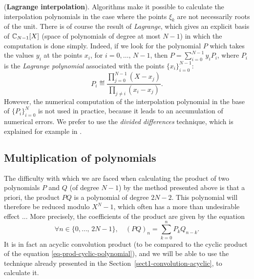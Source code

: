  
\begin{rem}{(\upshape \textbf{Lagrange interpolation}).} 
Algorithms make it possible to calculate the interpolation polynomials in the case where the points $ \xi_k $ are not necessarily roots of the unit. There is of course the result of \textit{Lagrange}, which gives an explicit basis of $ \mathbb{C}_{N-1}[X] $ (space of polynomials of degree at most $ N-1 $) in which the computation is done simply. Indeed, if we look for the polynomial $ P $ which takes the values $ y_i $ at the points $ x_i $, for $ i = 0, \ldots, \, N-1 $, then $ P = \sum_{i = 0}^{N-1}{y_i P_i} $, where $ P_i $ is the  \textit{Lagrange polynomial} associated with the points $ \{x_i \}_{i = 0}^{N-1} $:
\begin{equation*}
P_i \eqdef \frac{\prod_{j = 0}^{N-1} (X-x_j)}{\prod_{j \neq i} (x_i-x_j)}.
\end{equation*}
  However, the numerical computation of the interpolation polynomial in the base of $ \{P_i \}_{i = 0}^N $ is not used in practice, because it leads to an accumulation of numerical errors. We prefer to use the \textit{divided differences} technique, which is explained for example in \cite{demailly}.
\end{rem}
 
\subsection{Multiplication of polynomials}
\label{sect2-multiplication-polynomials} 
 
 
The difficulty with which we are faced when calculating the product of two polynomials $ P $ and $ Q $ (of degree $ N-1 $) by the method presented above is that a priori, the product $ PQ $ is a polynomial of degree $ 2N-2 $. This polynomial will therefore be reduced modulo $ X^N-1 $, which often has a more than undesirable effect ... More precisely, the coefficients of the product are given by the equation
\begin{equation}
\label{eq-product-polynomials}
\forall n \in \{0, \ldots, \, 2 N - 1 \}, \quad (PQ)_n = \sum_{k = 0}^{n}{P_k Q_{n - k}}.
\end{equation}
 It is in fact an acyclic convolution product (to be compared to the cyclic product of the equation \eqref{eq-prod-cyclic-polynomial}), and we will be able to use the technique already presented in the Section~\ref{sect1-convolution-acyclic}, to calculate it.
 
